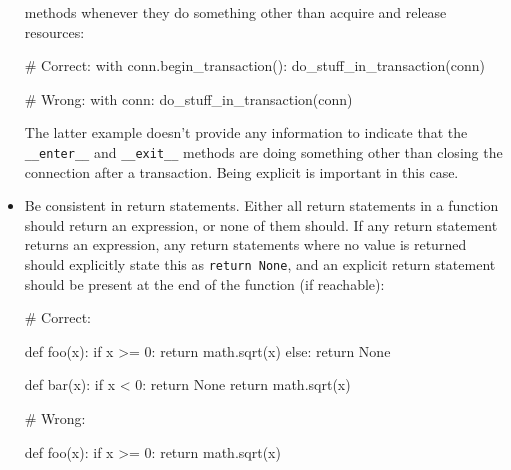 \documentclass[a4paper,11pt]{article}
\begin{document}
\begin{itemize}
methods whenever they do something other than acquire and release resources:
\begin{python}
# Correct:
with conn.begin_transaction():
    do_stuff_in_transaction(conn)
\end{python}
\begin{python}
# Wrong:
with conn:
    do_stuff_in_transaction(conn)
\end{python}
The latter example doesn’t provide any information to indicate that the 
\verb"__enter__" and \verb"__exit__" methods are doing something other than 
closing the connection after a transaction. Being explicit is important in 
this case.
\item Be consistent in return statements. Either all return statements in a 
function should return an expression, or none of them should. If any return 
statement returns an expression, any return statements where no value is 
returned should explicitly state this as \verb"return None", and an explicit 
return statement should be present at the end of the function (if reachable):
\begin{python}
# Correct:

def foo(x):
    if x >= 0:
        return math.sqrt(x)
    else:
        return None

def bar(x):
    if x < 0:
        return None
    return math.sqrt(x)
\end{python}
\begin{python}
# Wrong:

def foo(x):
    if x >= 0:
        return math.sqrt(x)


\end{python}
\end{itemize}
\end{document}
